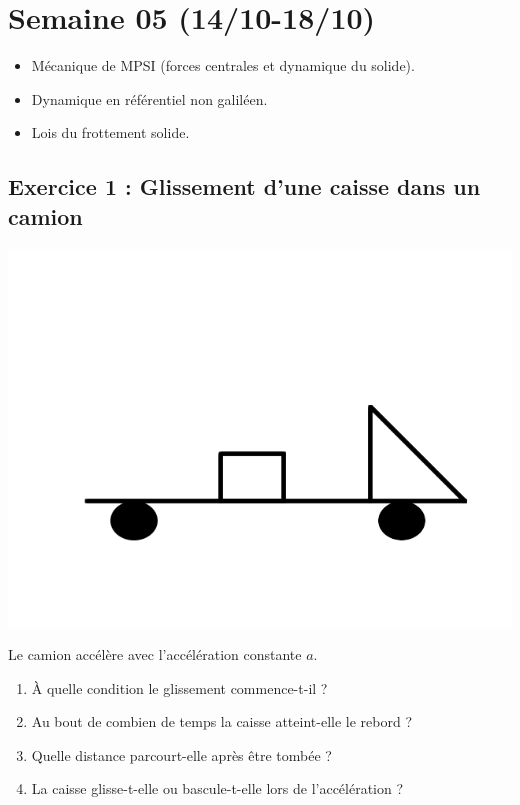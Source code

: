 \section{Semaine 05 (14/10-18/10) }

\begin{itemize}
	\item Mécanique de MPSI (forces centrales et dynamique du solide).
	\item Dynamique en référentiel non galiléen.
	\item Lois du frottement solide.
\end{itemize}

\subsection{Exercice 1 : Glissement d'une caisse dans un camion}

\begin{minipage}[c]{\linewidth/2}
	\includegraphics{./Images/mp_s05_ex01.png}
\end{minipage}%
\begin{minipage}[c]{\linewidth/2}
	Le camion accélère avec l'accélération constante $a$.
	\begin{enumerate}
		\item À quelle condition le glissement commence-t-il ?
		\item Au bout de combien de temps la caisse atteint-elle le rebord ?
		\item Quelle distance parcourt-elle après être tombée ?
		\item La caisse glisse-t-elle ou bascule-t-elle lors de l'accélération ?
	\end{enumerate}
\end{minipage}

